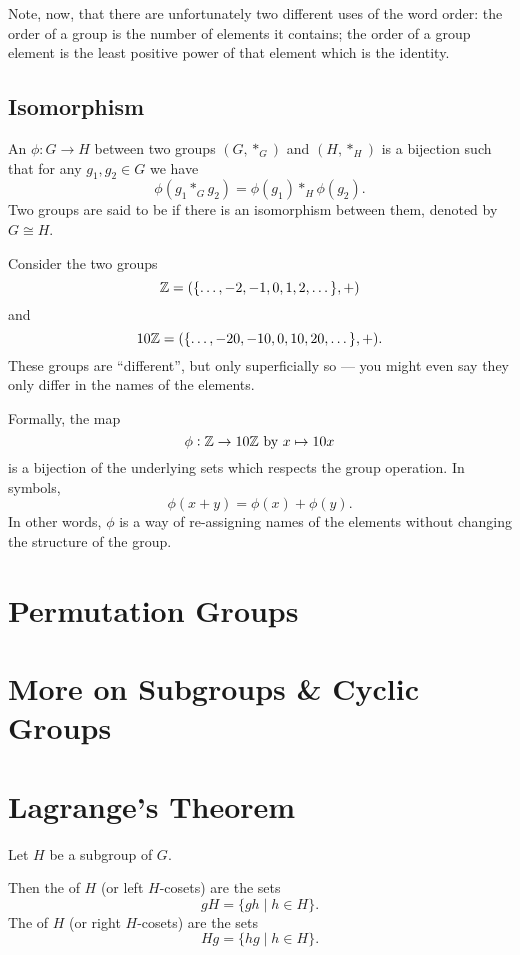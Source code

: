 \begin{remark}
Note, now, that there are unfortunately two different uses of the word order: the order of a group is the number of elements it contains; the order of a group element is the least positive power of that element which is the identity.
\end{remark}
\pagebreak

\subsection{Isomorphism}
\begin{definition}[Isomorphism]
An  $\phi: G \to H$ between two groups $(G,\ast_G)$ and $(H,\ast_H)$ is a bijection such that for any $g_1,g_2 \in G$ we have
\[ \phi(g_1 \ast_G g_2) = \phi(g_1) \ast_H \phi(g_2). \]
Two groups are said to be  if there is an isomorphism between them, denoted by $G \cong H$.
\end{definition}

\begin{example}[$\ZZ\cong10\ZZ$]
Consider the two groups
\[ \mathbb Z = (\{\dots, -2, -1, 0, 1, 2, \dots\}, +) \] and
\[ 10\mathbb Z = (\{\dots, -20, -10, 0, 10, 20, \dots\}, +). \]
These groups are ``different'', but only superficially so --- you might even say they only differ in the names of the elements.

Formally, the map
\[ \phi: \mathbb Z \to 10\mathbb Z \text{ by } x \mapsto 10x \]
is a bijection of the underlying sets which respects the group operation. In symbols,
\[ \phi(x+y) = \phi(x) + \phi(y). \]
In other words, $\phi$ is a way of re-assigning names of the elements without changing the structure of the group.
\end{example}
\pagebreak

\section{Permutation Groups}

\section{More on Subgroups \& Cyclic Groups}


\section{Lagrange's Theorem}
\begin{definition}[Coset]
Let $H$ be a subgroup of $G$.

Then the  of $H$ (or left $H$-cosets) are the sets
\[ gH=\{gh\mid h\in H\}. \]
The  of $H$ (or right $H$-cosets) are the sets
\[ Hg=\{hg\mid h\in H\}. \]
\end{definition}

